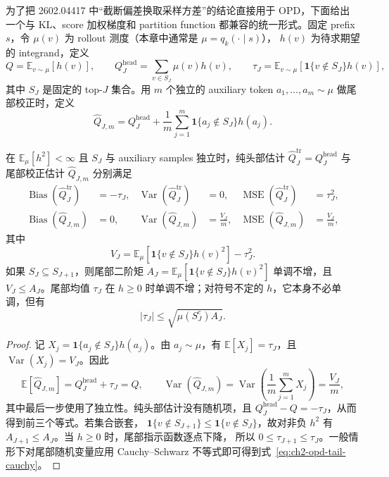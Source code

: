 \documentclass[lang=cn,scheme=chinese,openany]{../book/elegantbook}
\begin{document}
为了把 2602.04417 中“截断偏差换取采样方差”的结论直接用于 OPD，下面给出 一个与 KL、score 加权梯度和 partition function 都兼容的统一形式。固定 prefix $s$，令 $\mu(v)$ 为 rollout 测度（本章中通常是 $\mu=q_k(\cdot\mid s)$）， $h(v)$ 为待求期望的 integrand，定义
\begin{equation}
Q=\mathbb E_{v\sim\mu}[h(v)],\qquad
Q_J^{\mathrm{head}}=\sum_{v\in S_J}\mu(v)h(v),\qquad
\tau_J=\mathbb E_{v\sim\mu}[\mathbf 1\{v\notin S_J\}h(v)],
\label{eq:ch2-opd-generic-tail}
\end{equation}
其中 $S_J$ 是固定的 top-$J$ 集合。用 $m$ 个独立的 auxiliary token $a_1,\ldots,a_m\sim\mu$ 做尾部校正时，定义
\begin{equation}
\widehat Q_{J,m}=Q_J^{\mathrm{head}}+
\frac1m\sum_{j=1}^{m}\mathbf 1\{a_j\notin S_J\}h(a_j).
\label{eq:ch2-opd-generic-topk}
\end{equation}

\begin{theorem}
\label{thm:ch2-opd-topk-bias-variance}
在 $\mathbb E_\mu[h^2]<\infty$ 且 $S_J$ 与 auxiliary samples 独立时，纯头部估计 $\widehat Q_J^{\mathrm{tr}}=Q_J^{\mathrm{head}}$ 与尾部校正估计 $\widehat Q_{J,m}$ 分别满足
\begin{align}
\operatorname{Bias}(\widehat Q_J^{\mathrm{tr}})&=-\tau_J,&
\operatorname{Var}(\widehat Q_J^{\mathrm{tr}})&=0,&
\operatorname{MSE}(\widehat Q_J^{\mathrm{tr}})&=\tau_J^2,\\
\operatorname{Bias}(\widehat Q_{J,m})&=0,&
\operatorname{Var}(\widehat Q_{J,m})&=\frac{V_J}{m},&
\operatorname{MSE}(\widehat Q_{J,m})&=\frac{V_J}{m},
\end{align}
其中
\begin{equation}
V_J=\mathbb E_\mu\left[\mathbf 1\{v\notin S_J\}h(v)^2\right]-\tau_J^2.
\label{eq:ch2-opd-tail-variance}
\end{equation}
如果 $S_J\subseteq S_{J+1}$，则尾部二阶矩 $A_J=\mathbb E_\mu[\mathbf 1\{v\notin S_J\}h(v)^2]$ 单调不增，且 $V_J\le A_J$。尾部均值 $\tau_J$ 在 $h\ge0$ 时单调不增；对符号不定的 $h$，它本身不必单调，但有
\begin{equation}
|\tau_J|\le \sqrt{\mu(S_J^c)A_J}.
\label{eq:ch2-opd-tail-cauchy}
\end{equation}
\end{theorem}

\begin{proof}
记 $X_j=\mathbf 1\{a_j\notin S_J\}h(a_j)$。由 $a_j\sim\mu$，有 $\mathbb E[X_j]=\tau_J$，且 $\operatorname{Var}(X_j)=V_J$。因此
\begin{equation}
\mathbb E[\widehat Q_{J,m}]
 =Q_J^{\mathrm{head}}+\tau_J=Q,
\qquad
\operatorname{Var}(\widehat Q_{J,m})
 =\operatorname{Var}\left(\frac1m\sum_{j=1}^mX_j\right)
 =\frac{V_J}{m},
\end{equation}
其中最后一步使用了独立性。纯头部估计没有随机项，且 $Q_J^{\mathrm{head}}-Q=-\tau_J$，从而得到前三个等式。若集合嵌套， $\mathbf 1\{v\notin S_{J+1}\}\le\mathbf 1\{v\notin S_J\}$，故对非负 $h^2$ 有 $A_{J+1}\le A_J$。当 $h\ge0$ 时，尾部指示函数逐点下降， 所以 $0\le\tau_{J+1}\le\tau_J$。一般情形下对尾部随机变量应用 Cauchy--Schwarz 不等式即可得到式~\eqref{eq:ch2-opd-tail-cauchy}。
\end{proof}
\end{document}
